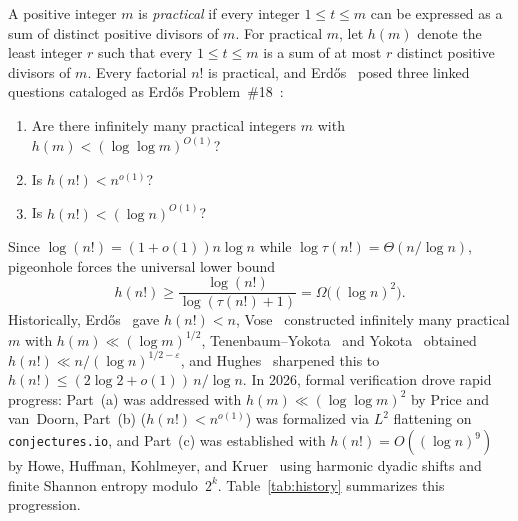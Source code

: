 \documentclass[11pt,a4paper]{amsart}
\theoremstyle{definition}
\theoremstyle{remark}
\begin{document}
A positive integer $m$ is \emph{practical} if every integer $1 \le t \le m$ can be expressed as a sum of distinct positive divisors of $m$. For practical $m$, let $h(m)$ denote the least integer $r$ such that every $1 \le t \le m$ is a sum of at most $r$ distinct positive divisors of $m$. Every factorial $n!$ is practical, and Erd\H{o}s~\cite{Er74b,ErGr80,Er81h} posed three linked questions cataloged as Erd\H{o}s Problem~\#18~\cite{Bloom18}:
\begin{enumerate}
  \item[(a)] Are there infinitely many practical integers $m$ with $h(m) < (\log\log m)^{O(1)}$?
  \item[(b)] Is $h(n!) < n^{o(1)}$?
  \item[(c)] Is $h(n!) < (\log n)^{O(1)}$?
\end{enumerate}

Since $\log(n!) = (1+o(1)) n\log n$ while $\log \tau(n!) = \Theta(n/\log n)$, pigeonhole forces the universal lower bound
\[
  h(n!) \ge \frac{\log(n!)}{\log(\tau(n!)+1)} = \Omega\bigl((\log n)^2\bigr).
\]
Historically, Erd\H{o}s~\cite{Er74b} gave $h(n!) < n$, Vose~\cite{Vo85} constructed infinitely many practical $m$ with $h(m) \ll (\log m)^{1/2}$, Tenenbaum--Yokota~\cite{TY90} and Yokota~\cite{Yo95} obtained $h(n!) \ll n/(\log n)^{1/2-\varepsilon}$, and Hughes~\cite{Hughes26} sharpened this to $h(n!) \le (2\log 2 + o(1))\,n/\log n$. In 2026, formal verification drove rapid progress: Part~(a) was addressed with $h(m) \ll (\log\log m)^2$ by Price and van~Doorn, Part~(b) ($h(n!) < n^{o(1)}$) was formalized via $L^2$ flattening on \texttt{conjectures.io}, and Part~(c) was established with $h(n!) = O((\log n)^9)$ by Howe, Huffman, Kohlmeyer, and Kruer~\cite{HHKK26} using harmonic dyadic shifts and finite Shannon entropy modulo~$2^k$. Table~\ref{tab:history} summarizes this progression.
\end{document}

